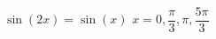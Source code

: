 { $\sin \left( 2x \right) = \sin \left( x \right)$}
{ $x = 0, \dfrac{\pi}{3}, \pi, \dfrac{5\pi}{3}$}
